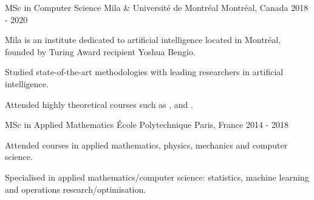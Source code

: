 \begin{cventries}
    \cventry
    {MSc in Computer Science} %
    {Mila \& Université de Montréal} %
    {Montréal, Canada} %
    {2018 - 2020} %
    {
            Mila is an institute dedicated to artificial intelligence located in Montréal, founded by Turing Award recipient Yoshua Bengio.
        \vspace{4.5mm}
        \begin{cvitems}
            \item Studied state-of-the-art methodologies with leading researchers in artificial intelligence.
            \item Attended highly theoretical courses such as ,  and .
        \end{cvitems}
    }

    \cventry
    {MSc in Applied Mathematics} %
    {École Polytechnique} %
    {Paris, France} %
    {2014 - 2018} %
    {
        \begin{cvitems} %
        \item Attended courses in applied mathematics, physics, mechanics and computer science.
        \item Specialised in applied mathematics/computer science: statistics, machine learning and operations research/optimisation.
      \end{cvitems}
    }




\end{cventries}
